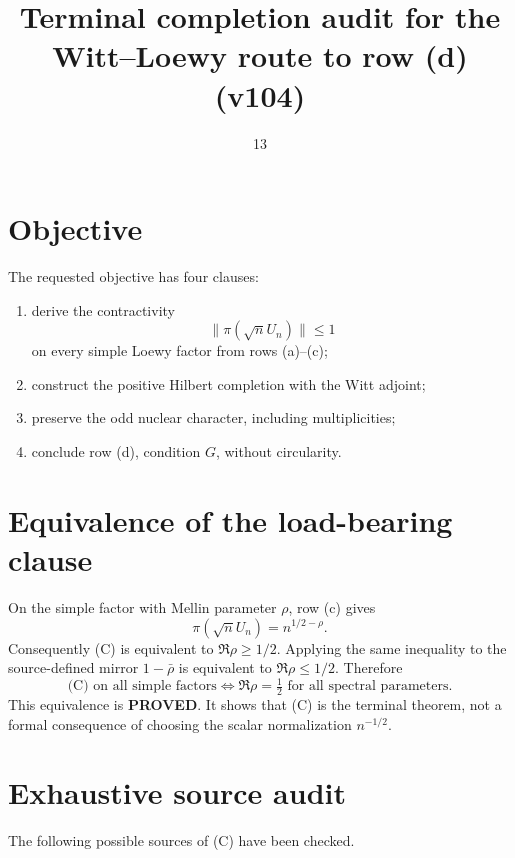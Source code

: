 \documentclass[11pt]{article}
\title{Terminal completion audit for the Witt--Loewy route to row (d) (v104)}
\date{13}
\newcommand{\PROVED}{\textcolor{green!40!black}{\textbf{PROVED}}}
\begin{document}
\maketitle

\section{Objective}

The requested objective has four clauses:
\begin{enumerate}
\item derive the contractivity
\begin{equation}
 \|\pi(\sqrt nU_n)\|\le1                              \tag{C}
\end{equation}
on every simple Loewy factor from rows (a)--(c);
\item construct the positive Hilbert completion with the Witt adjoint;
\item preserve the odd nuclear character, including multiplicities;
\item conclude row (d), condition $G$, without circularity.
\end{enumerate}

\section{Equivalence of the load-bearing clause}

On the simple factor with Mellin parameter $\rho$, row (c) gives
\begin{equation}
                 \pi(\sqrt nU_n)=n^{1/2-\rho}.        \tag{1}
\end{equation}
Consequently (C) is equivalent to $\Re\rho\ge1/2$.  Applying the same
inequality to the source-defined mirror $1-\bar\rho$ is equivalent to
$\Re\rho\le1/2$.  Therefore
\begin{equation}
 \boxed{\text{(C) on all simple factors}
 \iff \Re\rho=\tfrac12\text{ for all spectral parameters}.}  \tag{2}
\end{equation}
This equivalence is \PROVED.  It shows that (C) is the terminal theorem,
not a formal consequence of choosing the scalar normalization $n^{-1/2}$.

\section{Exhaustive source audit}

The following possible sources of (C) have been checked.
\end{document}

